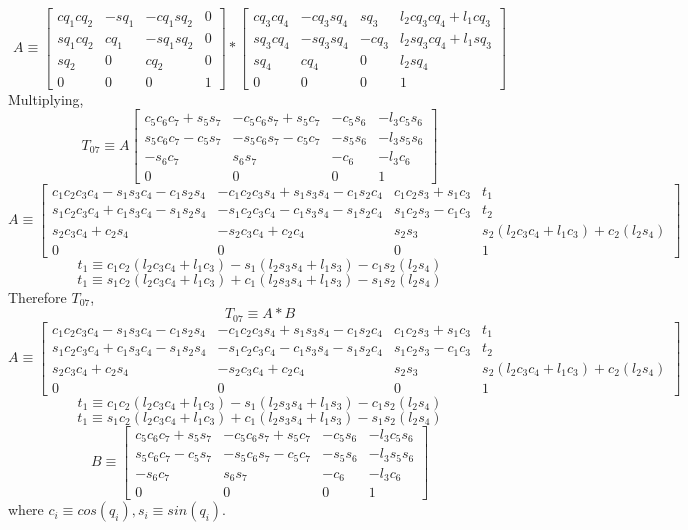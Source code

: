 \documentclass[12pt]{article}
\begin{document}
\[
  A \equiv
  \begin{bmatrix}
    cq_1cq_2 & -sq_1 & -cq_1sq_2 & 0 \\
    sq_1cq_2 & cq_1 & -sq_1sq_2 & 0 \\
    sq_2 & 0 & cq_2 & 0 \\
    0 & 0 & 0 & 1
  \end{bmatrix}
  *
  \begin{bmatrix}
    cq_3cq_4 & -cq_3sq_4 & sq_3 & l_2cq_3cq_4 + l_1cq_3 \\
    sq_3cq_4 & -sq_3sq_4 & -cq_3 & l_2sq_3cq_4 + l_1sq_3 \\
    sq_4 & cq_4 & 0 & l_2sq_4 \\
    0 & 0 & 0 & 1
  \end{bmatrix}
\]
Multiplying,
\[
  T_{07} \equiv
  A
  \begin{bmatrix}
    c_5c_6c_7 + s_5s_7 & -c_5c_6s_7 + s_5c_7 & -c_5s_6 & -l_3c_5s_6 \\
    s_5c_6c_7 - c_5s_7 & -s_5c_6s_7 - c_5c_7 & -s_5s_6 & -l_3s_5s_6 \\
    -s_6c_7 & s_6s_7 & -c_6 & -l_3c_6 \\
    0 & 0 & 0 & 1
  \end{bmatrix}
\]
\[
  A \equiv
  \begin{bmatrix}
    c_1c_2c_3c_4 - s_1s_3c_4 - c_1s_2s_4 & -c_1c_2c_3s_4 + s_1s_3s_4 - c_1s_2c_4 & c_1c_2s_3 + s_1c_3 & t_1 \\
    s_1c_2c_3c_4 + c_1s_3c_4 - s_1s_2s_4 & -s_1c_2c_3c_4 - c_1s_3s_4 - s_1s_2c_4 & s_1c_2s_3 - c_1c_3 & t_2 \\
    s_2c_3c_4 + c_2s_4 & -s_2c_3c_4 + c_2c_4 & s_2s_3 & s_2(l_2c_3c_4 + l_1c_3) + c_2(l_2s_4) \\
    0 & 0 & 0 & 1
  \end{bmatrix}
\]
\[
  t_1 \equiv  c_1c_2(l_2c_3c_4 + l_1c_3) -s_1(l_2s_3s_4 + l_1s_3) -c_1s_2(l_2s_4)
\]
\[
  t_1 \equiv s_1c_2(l_2c_3c_4 + l_1c_3) + c_1(l_2s_3s_4 + l_1s_3) -s_1s_2(l_2s_4)
\]
Therefore $T_{07}$,
\[
  T_{07} \equiv A * B
\]
\[
  A \equiv
  \begin{bmatrix}
    c_1c_2c_3c_4 - s_1s_3c_4 - c_1s_2s_4 & -c_1c_2c_3s_4 + s_1s_3s_4 - c_1s_2c_4 & c_1c_2s_3 + s_1c_3 & t_1 \\
    s_1c_2c_3c_4 + c_1s_3c_4 - s_1s_2s_4 & -s_1c_2c_3c_4 - c_1s_3s_4 - s_1s_2c_4 & s_1c_2s_3 - c_1c_3 & t_2 \\
    s_2c_3c_4 + c_2s_4 & -s_2c_3c_4 + c_2c_4 & s_2s_3 & s_2(l_2c_3c_4 + l_1c_3) + c_2(l_2s_4) \\
    0 & 0 & 0 & 1
  \end{bmatrix}
\]
\[
  t_1 \equiv  c_1c_2(l_2c_3c_4 + l_1c_3) -s_1(l_2s_3s_4 + l_1s_3) -c_1s_2(l_2s_4)
\]
\[
  t_1 \equiv s_1c_2(l_2c_3c_4 + l_1c_3) + c_1(l_2s_3s_4 + l_1s_3) -s_1s_2(l_2s_4)
\]
\[
  B \equiv
  \begin{bmatrix}
    c_5c_6c_7 + s_5s_7 & -c_5c_6s_7 + s_5c_7 & -c_5s_6 & -l_3c_5s_6 \\
    s_5c_6c_7 - c_5s_7 & -s_5c_6s_7 - c_5c_7 & -s_5s_6 & -l_3s_5s_6 \\
    -s_6c_7 & s_6s_7 & -c_6 & -l_3c_6 \\
    0 & 0 & 0 & 1
  \end{bmatrix}
\]
where $c_i \equiv cos(q_i), s_i \equiv sin(q_i)$.
\end{document}
